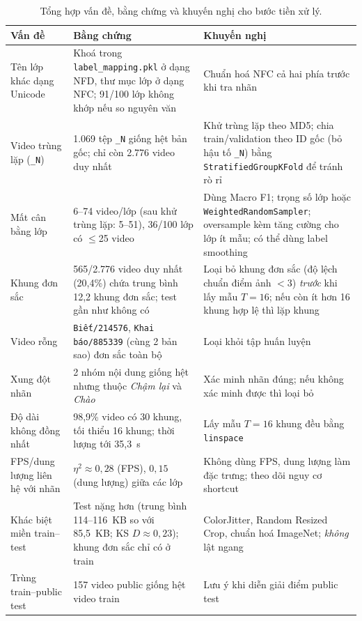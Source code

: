 \begin{table}[H]
  \centering
  \caption{Tổng hợp vấn đề, bằng chứng và khuyến nghị cho bước tiền xử lý.}
  \label{tab:eda_reco}
  \small
  \begin{tabular}{@{}p{}p{}p{}@{}}
    \toprule
    \textbf{Vấn đề} & \textbf{Bằng chứng} & \textbf{Khuyến nghị} \\
    \midrule
    Tên lớp khác dạng Unicode & Khoá trong \texttt{label\_mapping.pkl} ở dạng NFD, thư mục lớp ở dạng NFC; 91/100 lớp không khớp nếu so nguyên văn & Chuẩn hoá NFC cả hai phía trước khi tra nhãn \\
    \addlinespace
    Video trùng lặp (\texttt{\_N}) & 1.069 tệp \texttt{\_N} giống hệt bản gốc; chỉ còn 2.776 video duy nhất & Khử trùng lặp theo MD5; chia train/validation theo ID gốc (bỏ hậu tố \texttt{\_N}) bằng \texttt{StratifiedGroupKFold} để tránh rò rỉ \\
    \addlinespace
    Mất cân bằng lớp & 6--74 video/lớp (sau khử trùng lặp: 5--51), 36/100 lớp có $\leq$25 video & Dùng Macro F1; trọng số lớp hoặc \texttt{WeightedRandomSampler}; oversample kèm tăng cường cho lớp ít mẫu; có thể dùng label smoothing \\
    \addlinespace
    Khung đơn sắc & 565/2.776 video duy nhất (20,4\%) chứa trung bình 12,2 khung đơn sắc; test gần như không có & Loại bỏ khung đơn sắc (độ lệch chuẩn điểm ảnh $<3$) \emph{trước} khi lấy mẫu $T=16$; nếu còn ít hơn 16 khung hợp lệ thì lặp khung \\
    \addlinespace
    Video rỗng & \texttt{Biết/214576}, \texttt{Khai báo/885339} (cùng 2 bản sao) đơn sắc toàn bộ & Loại khỏi tập huấn luyện \\
    \addlinespace
    Xung đột nhãn & 2 nhóm nội dung giống hệt nhưng thuộc \textit{Chậm lại} và \textit{Chào} & Xác minh nhãn đúng; nếu không xác minh được thì loại bỏ \\
    \addlinespace
    Độ dài không đồng nhất & 98,9\% video có 30 khung, tối thiểu 16 khung; thời lượng tới 35,3~s & Lấy mẫu $T=16$ khung đều bằng \texttt{linspace} \\
    \addlinespace
    FPS/dung lượng liên hệ với nhãn & $\eta^2\approx0{,}28$ (FPS), $0{,}15$ (dung lượng) giữa các lớp & Không dùng FPS, dung lượng làm đặc trưng; theo dõi nguy cơ shortcut \\
    \addlinespace
    Khác biệt miền train--test & Test nặng hơn (trung bình 114--116~KB so với 85,5~KB; KS $D\approx0{,}23$); khung đơn sắc chỉ có ở train & ColorJitter, Random Resized Crop, chuẩn hoá ImageNet; \emph{không} lật ngang \\
    \addlinespace
    Trùng train--public test & 157 video public giống hệt video train & Lưu ý khi diễn giải điểm public test \\
    \bottomrule
  \end{tabular}
\end{table}

